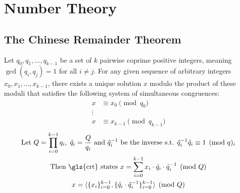 \chapter{Number Theory}

\section{The Chinese Remainder Theorem}
\label{app:crt}

\begin{definition}
    \label{def:crt}
    Let $q_0, q_1, \dots, q_{k-1}$ be a set of $k$ pairwise coprime positive integers, meaning $\gcd(q_i, q_j) = 1$ for all $i \neq j$. For any given sequence of arbitrary integers $x_0, x_1, \dots, x_{k-1}$, there exists a unique solution $x$ modulo the product of these moduli that satisfies the following system of simultaneous congruences:
    \begin{align*}
        x &\equiv x_0 \pmod{q_0} \\
        \vdots \\
        x &\equiv x_{k-1} \pmod{q_{k-1}}
    \end{align*}
    \begin{gather}
        \nonumber
        \text{Let } Q = \prod_{i=0}^{k-1}q_i, \; \hat{q}_i = \frac{Q}{q_i} \text{ and } \hat{q}_i^{-1} \text{ be the inverse s.t. } \hat{q}_i^{-1}\hat{q}_i \equiv 1 \pmod q_i
        \\
        \text{Then \gls{crt} states } x = \sum_{i=0}^{k-1} x_i \cdot \hat{q}_i \cdot \hat{q}_i^{-1} \pmod{Q} 
        \\
        \label{eq:crt-gadget}
        x = \langle \{ x_i \}_{i=0}^{k-1}, \{ \hat{q}_i\cdot\hat{q}_i^{-1} \}_{i=0}^{k-1} \rangle \pmod{Q}
    \end{gather}
\end{definition}




